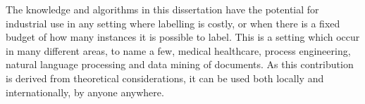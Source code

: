 \begin{impactstatement}








The knowledge and algorithms in this dissertation have the potential for
industrial use in any setting where labelling is costly, or when there is a
fixed budget of how many instances it is possible to label. This is a setting
which occur in many different areas, to name a few, medical healthcare, process
engineering, natural language processing and data mining of documents. As
this contribution is derived from theoretical considerations, it can be used
both locally and internationally, by anyone anywhere.


\end{impactstatement}
